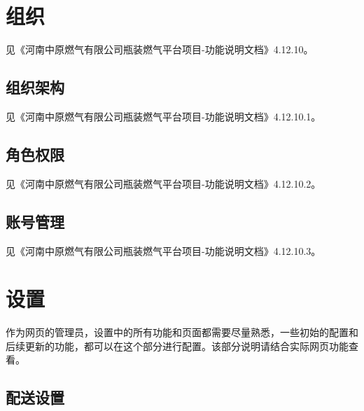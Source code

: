 \documentclass[UTF8]{ctexart}
\begin{document}
\section{组织}

见《河南中原燃气有限公司瓶装燃气平台项目-功能说明文档》4.12.10。

\subsection{组织架构}

见《河南中原燃气有限公司瓶装燃气平台项目-功能说明文档》4.12.10.1。

\subsection{角色权限}

见《河南中原燃气有限公司瓶装燃气平台项目-功能说明文档》4.12.10.2。

\subsection{账号管理}

见《河南中原燃气有限公司瓶装燃气平台项目-功能说明文档》4.12.10.3。



\section{设置}
作为网页的管理员，设置中的所有功能和页面都需要尽量熟悉，一些初始的配置和后续更新的功能，都可以在这个部分进行配置。该部分说明请结合实际网页功能查看。

\subsection{配送设置}
\end{document}
